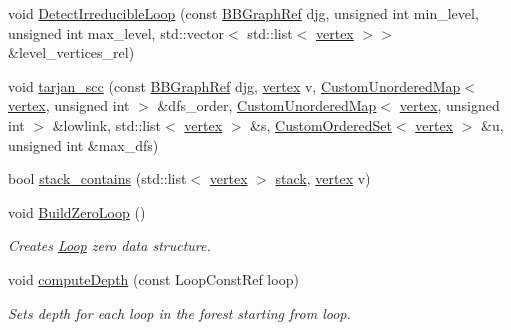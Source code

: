 \begin{DoxyCompactItemize}
void \hyperlink{classLoops_aac2e78898f8485a50d57e97b9e474dd4}{Detect\+Irreducible\+Loop} (const \hyperlink{basic__block_8hpp_a0e7f233d1b83cad0bfd5aa865f0d3532}{B\+B\+Graph\+Ref} djg, unsigned int min\+\_\+level, unsigned int max\+\_\+level, std\+::vector$<$ std\+::list$<$ \hyperlink{graph_8hpp_abefdcf0544e601805af44eca032cca14}{vertex} $>$$>$ \&level\+\_\+vertices\+\_\+rel)
\item 
void \hyperlink{classLoops_ae9b35d5e7f808751d95c7dc05e18c7a4}{tarjan\+\_\+scc} (const \hyperlink{basic__block_8hpp_a0e7f233d1b83cad0bfd5aa865f0d3532}{B\+B\+Graph\+Ref} djg, \hyperlink{graph_8hpp_abefdcf0544e601805af44eca032cca14}{vertex} v, \hyperlink{custom__map_8hpp_ad1ed68f2ff093683ab1a33522b144adc}{Custom\+Unordered\+Map}$<$ \hyperlink{graph_8hpp_abefdcf0544e601805af44eca032cca14}{vertex}, unsigned int $>$ \&dfs\+\_\+order, \hyperlink{custom__map_8hpp_ad1ed68f2ff093683ab1a33522b144adc}{Custom\+Unordered\+Map}$<$ \hyperlink{graph_8hpp_abefdcf0544e601805af44eca032cca14}{vertex}, unsigned int $>$ \&lowlink, std\+::list$<$ \hyperlink{graph_8hpp_abefdcf0544e601805af44eca032cca14}{vertex} $>$ \&s, \hyperlink{classCustomOrderedSet}{Custom\+Ordered\+Set}$<$ \hyperlink{graph_8hpp_abefdcf0544e601805af44eca032cca14}{vertex} $>$ \&u, unsigned int \&max\+\_\+dfs)
\item 
bool \hyperlink{classLoops_a695381637512bc8e48b578cc27137adb}{stack\+\_\+contains} (std\+::list$<$ \hyperlink{graph_8hpp_abefdcf0544e601805af44eca032cca14}{vertex} $>$ \hyperlink{structstack}{stack}, \hyperlink{graph_8hpp_abefdcf0544e601805af44eca032cca14}{vertex} v)
\item 
void \hyperlink{classLoops_ab35bfb9d05e559e6295037325ad22a1d}{Build\+Zero\+Loop} ()
\begin{DoxyCompactList}\small\item\em Creates \hyperlink{classLoop}{Loop} zero data structure. \end{DoxyCompactList}\item 
void \hyperlink{classLoops_a9409bfa50f8431dfbe3af427ac4c6de9}{compute\+Depth} (const Loop\+Const\+Ref loop)
\begin{DoxyCompactList}\small\item\em Sets depth for each loop in the forest starting from loop. \end{DoxyCompactList}\end{DoxyCompactItemize}
